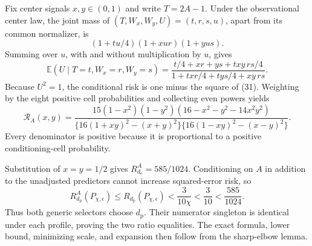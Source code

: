 Fix center signals \(x,y\in(0,1)\) and write \(T=2A-1\). Under the observational center law, the joint mass of \((T,W_x,W_y,U)=(t,r,s,u)\), apart from its common normalizer, is
\[
 (1+tu/4)(1+xur)(1+yus).                                   \tag{30}
\]
Summing over \(u\), with and without multiplication by \(u\), gives
\[
 \mathbb E(U\mid T=t,W_x=r,W_y=s)
 =\frac{t/4+xr+ys+txy\,rs/4}
 {1+txr/4+tys/4+xy\,rs}.                                  \tag{31}
\]
Because \(U^2=1\), the conditional risk is one minus the square of (31). Weighting by the eight positive cell probabilities and collecting even powers yields
\[
 \mathcal R_A(x,y)=
 \frac{15(1-x^2)(1-y^2)(16-x^2-y^2-14x^2y^2)}
 {\{16(1+xy)^2-(x+y)^2\}\{16(1-xy)^2-(x-y)^2\}}.         \tag{32}
\]
Every denominator is positive because it is proportional to a positive conditioning-cell probability.

Substitution of \(x=y=1/2\) gives \(R_{d_{\mathrm e}}^A=585/1024\). Conditioning on \(A\) in addition to the unadjusted predictors cannot increase squared-error risk, so
\[
 R_{d_{\mathrm p}}^A(P_{\chi,\epsilon})
 \le R_{d_{\mathrm p}}(P_{\chi,\epsilon})
 <\frac3{10\chi}<\frac3{10}<\frac{585}{1024}.
\]
Thus both generic selectors choose \(d_{\mathrm p}\). Their numerator singleton is identical under each profile, proving the two ratio equalities. The exact formula, lower bound, minimizing scale, and expansion then follow from the sharp-elbow lemma.